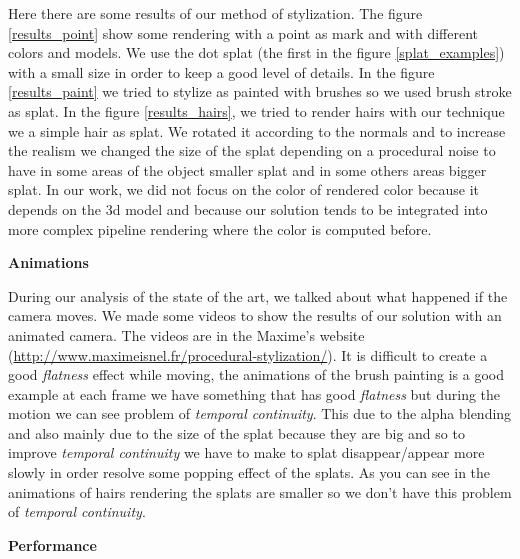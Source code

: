 Here there are some results of our method of stylization. The figure \ref{results_point} show some rendering with a point as mark and with different colors and models. We use the dot splat (the first in the figure \ref{splat_examples}) with a small size in order to keep a good level of details. In the figure \ref{results_paint} we tried to stylize as painted with brushes so we used brush stroke as splat. In the figure \ref{results_hairs}, we tried to render hairs with our technique we a simple hair as splat. We rotated it according to the normals and to increase the realism we changed the size of the splat depending on a procedural noise to have in some areas of the object smaller splat and in some others areas bigger splat. In our work, we did not focus on the color of rendered color because it depends on the 3d model and because our solution tends to be integrated into more complex pipeline rendering where the color is computed before.\newline

\textbf{Animations}

During our analysis of the state of the art, we talked about what happened if the camera moves. We made some videos to show the results of our solution with an animated camera. The videos are in the Maxime's website (\href{http://www.maximeisnel.fr/procedural-stylization/}{http://www.maximeisnel.fr/procedural-stylization/}). It is difficult to create a good \textit{flatness} effect while moving, the animations of the brush painting is a good example at each frame we have something that has good \textit{flatness} but during the motion we can see problem of \textit{temporal continuity}. This due to the alpha blending and also mainly due to the size of the splat because they are big and so to improve \textit{temporal continuity} we have to make to splat disappear/appear more slowly in order resolve some popping effect of the splats. As you can see in the animations of hairs rendering the splats are smaller so we don't have this problem of \textit{temporal continuity}. \newline


\textbf{Performance}

